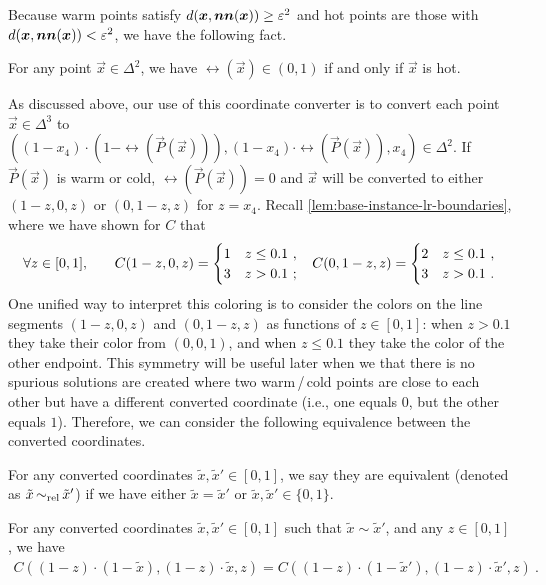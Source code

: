 Because warm points satisfy $d(\boldsymbol{x},\operatorname*{\boldsymbol{nn}}(\boldsymbol{x}))\geq \varepsilon^2$ and hot points are those with $d(\boldsymbol{x}, \operatorname*{\boldsymbol{nn}}(\boldsymbol{x}))<\varepsilon^2$, we have the following fact.
\begin{fact}
    \label{fact:hot-versus-value}
    For any point $\vec{x}\in \Delta^2$, we have $\rel(\vec{x})\in (0,1)$ if and only if $\vec{x}$ is hot.
\end{fact}
As discussed above, our use of this coordinate converter is to convert each point $\vec{x}\in \Delta^3$ to $((1-x_4)\cdot (1-\rel(\vec{P}(\vec{x}))), (1-x_4)\cdot \rel(\vec{P}(\vec{x})), x_4)\in \Delta^2$.
If $\vec{P}(\vec{x})$ is warm or cold, $\rel(\vec{P}(\vec{x}))=0$ and $\vec{x}$ will be converted to either $(1-z,0,z)$ or $(0,1-z,z)$ for $z=x_4$. 
Recall \cref{lem:base-instance-lr-boundaries}, where we have shown for $C$ that
\begin{align*}
 \forall z\in [0,1], \quad \quad & \hfill C(1-z,0,z) = \begin{cases}
    1 & z\leq 0.1~, \\
    3 & z>0.1~;
 \end{cases}
 \hfill
 &
 \hfill
 C(0,1-z,z) = \begin{cases}
    2 & z\leq 0.1~, \\
    3 & z>0.1~.
 \end{cases}
 \hfill
\end{align*} 
One unified way to interpret this coloring is to consider the colors on the line segments $(1-z,0,z)$ and $(0,1-z,z)$ as functions of $z \in [0,1]$: when $z > 0.1$ they take their color from $(0,0,1)$, and when $z \le 0.1$ they take the color of the other endpoint. 
This symmetry will be useful later when we that there is no spurious solutions are created where two warm\,/\,cold points are close to each other but have a different converted coordinate (i.e., one equals $0$, but the other equals $1$). 
Therefore, we can consider the following equivalence between the converted coordinates.

\begin{definition}
    \label{def:equiv-converted-coordinates}
    For any converted coordinates $\tilde{x}, \tilde{x}'\in [0,1]$, we say they are equivalent (denoted as $\tilde{x}\operatorname*{\sim_{\rm rel}} \tilde{x}'$) if we have either $\tilde{x}=\tilde{x}'$ or $\tilde{x},\tilde{x}'\in \{0,1\}$. 
\end{definition}

\begin{claim}
    \label{lem:color-equiv-for-converted}
    For any converted coordinates $\tilde{x}, \tilde{x}'\in [0,1]$ such that $\tilde{x}\sim \tilde{x}'$, and any $z\in [0,1]$, we have 
    \begin{align*}
        C((1-z)\cdot (1-\tilde{x}), (1-z)\cdot \tilde{x}, z) = C((1-z)\cdot (1-\tilde{x}'), (1-z)\cdot \tilde{x}', z)~.
    \end{align*}
\end{claim}

